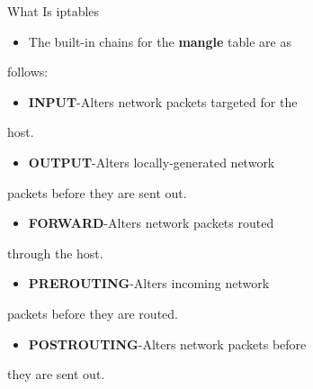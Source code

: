 \begin{frame}[t,allowframebreaks]{What Is iptables}
  \fontsize{15}{18}\selectfont
  \begin{itemize}
    \item The built-in chains for the \textcolor{CommandGreen}{\bfseries mangle} table are as
  \end{itemize}
  follows:\par
  \begin{itemize}
    \item \textcolor{WarningColor}{\bfseries INPUT}-Alters network packets targeted for the
  \end{itemize}
  host.\par
  \begin{itemize}
    \item \textcolor{WarningColor}{\bfseries OUTPUT}-Alters locally-generated network
  \end{itemize}
  packets before they are sent out.\par
  \begin{itemize}
    \item \textcolor{WarningColor}{\bfseries FORWARD}-Alters network packets routed
  \end{itemize}
  through the host.\par
  \begin{itemize}
    \item \textcolor{WarningColor}{\bfseries PREROUTING}-Alters incoming network
  \end{itemize}
  packets before they are routed.\par
  \begin{itemize}
    \item \textcolor{WarningColor}{\bfseries POSTROUTING}-Alters network packets before
  \end{itemize}
  they are sent out.\par
\end{frame}
